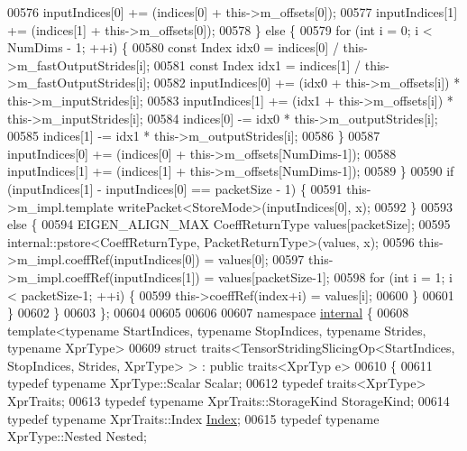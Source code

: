 \begin{DoxyCode}
00576       inputIndices[0] += (indices[0] + this->m\_offsets[0]);
00577       inputIndices[1] += (indices[1] + this->m\_offsets[0]);
00578     \} \textcolor{keywordflow}{else} \{
00579       \textcolor{keywordflow}{for} (\textcolor{keywordtype}{int} i = 0; i < NumDims - 1; ++i) \{
00580         \textcolor{keyword}{const} Index idx0 = indices[0] / this->m\_fastOutputStrides[i];
00581         \textcolor{keyword}{const} Index idx1 = indices[1] / this->m\_fastOutputStrides[i];
00582         inputIndices[0] += (idx0 + this->m\_offsets[i]) * this->m\_inputStrides[i];
00583         inputIndices[1] += (idx1 + this->m\_offsets[i]) * this->m\_inputStrides[i];
00584         indices[0] -= idx0 * this->m\_outputStrides[i];
00585         indices[1] -= idx1 * this->m\_outputStrides[i];
00586       \}
00587       inputIndices[0] += (indices[0] + this->m\_offsets[NumDims-1]);
00588       inputIndices[1] += (indices[1] + this->m\_offsets[NumDims-1]);
00589     \}
00590     \textcolor{keywordflow}{if} (inputIndices[1] - inputIndices[0] == packetSize - 1) \{
00591       this->m\_impl.template writePacket<StoreMode>(inputIndices[0], x);
00592     \}
00593     \textcolor{keywordflow}{else} \{
00594       EIGEN\_ALIGN\_MAX CoeffReturnType values[packetSize];
00595       internal::pstore<CoeffReturnType, PacketReturnType>(values, x);
00596       this->m\_impl.coeffRef(inputIndices[0]) = values[0];
00597       this->m\_impl.coeffRef(inputIndices[1]) = values[packetSize-1];
00598       \textcolor{keywordflow}{for} (\textcolor{keywordtype}{int} i = 1; i < packetSize-1; ++i) \{
00599         this->coeffRef(index+i) = values[i];
00600       \}
00601     \}
00602   \}
00603 \};
00604 
00605 
00606 
00607 \textcolor{keyword}{namespace }\hyperlink{namespaceinternal}{internal} \{
00608 \textcolor{keyword}{template}<\textcolor{keyword}{typename} StartIndices, \textcolor{keyword}{typename} StopIndices, \textcolor{keyword}{typename} Str\textcolor{keywordtype}{id}es, \textcolor{keyword}{typename} XprType>
00609 \textcolor{keyword}{struct }traits<TensorStridingSlicingOp<StartIndices, StopIndices, Strides, XprType> > : \textcolor{keyword}{public} traits<XprTyp
      e>
00610 \{
00611   \textcolor{keyword}{typedef} \textcolor{keyword}{typename} XprType::Scalar Scalar;
00612   \textcolor{keyword}{typedef} traits<XprType> XprTraits;
00613   \textcolor{keyword}{typedef} \textcolor{keyword}{typename} XprTraits::StorageKind StorageKind;
00614   \textcolor{keyword}{typedef} \textcolor{keyword}{typename} XprTraits::Index \hyperlink{namespace_eigen_a62e77e0933482dafde8fe197d9a2cfde}{Index};
00615   \textcolor{keyword}{typedef} \textcolor{keyword}{typename} XprType::Nested Nested;

\end{DoxyCode}
